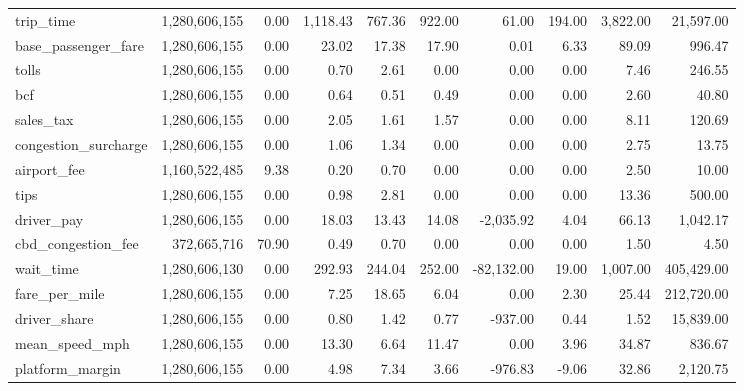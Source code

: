 \begin{tabular}{lrrrrrrrrr}
trip\_time & 1,280,606,155 & 0.00 & 1,118.43 & 767.36 & 922.00 & 61.00 & 194.00 & 3,822.00 & 21,597.00 \\
base\_passenger\_fare & 1,280,606,155 & 0.00 & 23.02 & 17.38 & 17.90 & 0.01 & 6.33 & 89.09 & 996.47 \\
tolls & 1,280,606,155 & 0.00 & 0.70 & 2.61 & 0.00 & 0.00 & 0.00 & 7.46 & 246.55 \\
bcf & 1,280,606,155 & 0.00 & 0.64 & 0.51 & 0.49 & 0.00 & 0.00 & 2.60 & 40.80 \\
sales\_tax & 1,280,606,155 & 0.00 & 2.05 & 1.61 & 1.57 & 0.00 & 0.00 & 8.11 & 120.69 \\
congestion\_surcharge & 1,280,606,155 & 0.00 & 1.06 & 1.34 & 0.00 & 0.00 & 0.00 & 2.75 & 13.75 \\
airport\_fee & 1,160,522,485 & 9.38 & 0.20 & 0.70 & 0.00 & 0.00 & 0.00 & 2.50 & 10.00 \\
tips & 1,280,606,155 & 0.00 & 0.98 & 2.81 & 0.00 & 0.00 & 0.00 & 13.36 & 500.00 \\
driver\_pay & 1,280,606,155 & 0.00 & 18.03 & 13.43 & 14.08 & -2,035.92 & 4.04 & 66.13 & 1,042.17 \\
cbd\_congestion\_fee & 372,665,716 & 70.90 & 0.49 & 0.70 & 0.00 & 0.00 & 0.00 & 1.50 & 4.50 \\
wait\_time & 1,280,606,130 & 0.00 & 292.93 & 244.04 & 252.00 & -82,132.00 & 19.00 & 1,007.00 & 405,429.00 \\
fare\_per\_mile & 1,280,606,155 & 0.00 & 7.25 & 18.65 & 6.04 & 0.00 & 2.30 & 25.44 & 212,720.00 \\
driver\_share & 1,280,606,155 & 0.00 & 0.80 & 1.42 & 0.77 & -937.00 & 0.44 & 1.52 & 15,839.00 \\
mean\_speed\_mph & 1,280,606,155 & 0.00 & 13.30 & 6.64 & 11.47 & 0.00 & 3.96 & 34.87 & 836.67 \\
platform\_margin & 1,280,606,155 & 0.00 & 4.98 & 7.34 & 3.66 & -976.83 & -9.06 & 32.86 & 2,120.75 \\
\bottomrule
\end{tabular}
